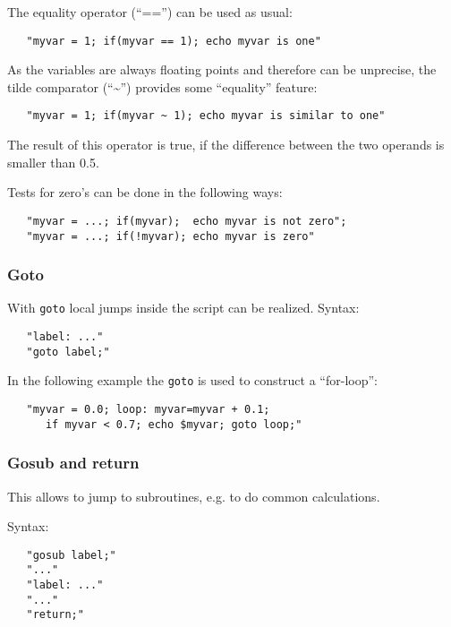 {The equality operator (``=='') can be used as usual:
\begin{verbatim}
   "myvar = 1; if(myvar == 1); echo myvar is one"
\end{verbatim}

As the variables are always floating points and therefore can be
unprecise, the tilde comparator (``\textasciitilde'') provides some
``equality'' feature:

\begin{verbatim}
   "myvar = 1; if(myvar ~ 1); echo myvar is similar to one"
\end{verbatim}

The result of this operator is true, if the difference between the two
operands is smaller than 0.5.

Tests for zero's can be done in the following ways:

\begin{verbatim}
   "myvar = ...; if(myvar);  echo myvar is not zero";
   "myvar = ...; if(!myvar); echo myvar is zero"
\end{verbatim}



\subsubsection{Goto}

With {\tt goto} local jumps inside the script can be realized. Syntax:

\begin{verbatim}
   "label: ..."
   "goto label;"
\end{verbatim}

In the following example the {\tt goto} is used to construct a ``for-loop'':

\begin{verbatim}
   "myvar = 0.0; loop: myvar=myvar + 0.1; 
      if myvar < 0.7; echo $myvar; goto loop;"
\end{verbatim}

\subsubsection{Gosub and return}

This allows to jump to subroutines, e.g. to do common calculations.

Syntax:

\begin{verbatim}
   "gosub label;"
   "..."
   "label: ..."
   "..."
   "return;"
\end{verbatim}

}
